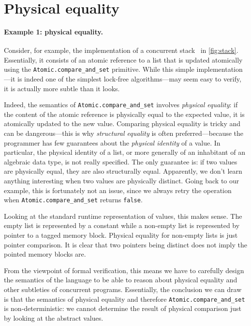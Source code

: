 \section{Physical equality}
\label{sec:physical_equality}



\paragraph{Example 1: physical equality.}

Consider, for example, the \OCaml implementation of a concurrent stack~\cite{thomas1986systems} in \cref{fig:stack}.
Essentially, it consists of an atomic reference to a list that is updated atomically using the \texttt{Atomic.compare_and_set} primitive.
While this simple implementation---it is indeed one of the simplest lock-free algorithms---may seem easy to verify, it is actually more subtle than it looks.

Indeed, the semantics of \texttt{Atomic.compare_and_set} involves \emph{physical equality}: if the content of the atomic reference is physically equal to the expected value, it is atomically updated to the new value.
Comparing physical equality is tricky and can be dangerous---this is why \emph{structural equality} is often preferred---because the programmer has few guarantees about the \emph{physical identity} of a value.
In particular, the physical identity of a list, or more generally of an inhabitant of an algebraic data type, is not really specified.
The only guarantee is: if two values are physically equal, they are also structurally equal.
Apparently, we don't learn anything interesting when two values are physically distinct.
Going back to our example, this is fortunately not an issue, since we always retry the operation when \texttt{Atomic.compare_and_set} returns \texttt{false}.

Looking at the standard runtime representation of \OCaml values, this makes sense.
The empty list is represented by a constant while a non-empty list is represented by pointer to a tagged memory block.
Physical equality for non-empty lists is just pointer comparison.
It is clear that two pointers being distinct does not imply the pointed memory blocks are.

From the viewpoint of formal verification, this means we have to carefully design the semantics of the language to be able to reason about physical equality and other subtleties of concurrent programs.
Essentially, the conclusion we can draw is that the semantics of physical equality and therefore \texttt{Atomic.compare_and_set} is non-deterministic: we cannot determine the result of physical comparison just by looking at the abstract values.

